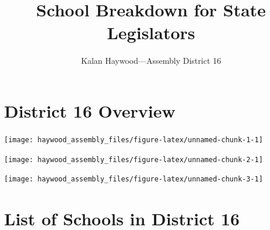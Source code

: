 \documentclass[
]{article}
\title{School Breakdown for State Legislators}
\subtitle{Kalan Haywood---Assembly District 16}
\author{}
\date{\vspace{-2.5em}}
\begin{document}
\maketitle

{
\setcounter{tocdepth}{3}
\tableofcontents
}
\newpage

\hypertarget{district-16-overview}{%
\section{District 16 Overview}\label{district-16-overview}}

\vspace{.25in}

\begin{center}\texttt{[image: haywood\_assembly\_files/figure-latex/unnamed-chunk-1-1]} \end{center}

\newpage

\begin{center}\texttt{[image: haywood\_assembly\_files/figure-latex/unnamed-chunk-2-1]} \end{center}

\begin{center}\texttt{[image: haywood\_assembly\_files/figure-latex/unnamed-chunk-3-1]} \end{center}

\newpage

\hypertarget{list-of-schools-in-district-16}{%
\section{List of Schools in District
16}\label{list-of-schools-in-district-16}}

\begingroup\fontsize{8}{10}\selectfont
\end{document}
